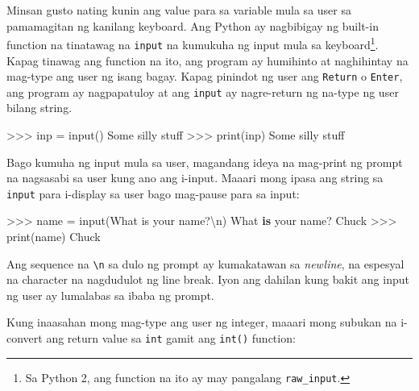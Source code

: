 \documentclass[10pt,]{book}
\newenvironment{Shaded}{}{}
\newcommand{\BuiltInTok}[1]{\textcolor[rgb]{0.00,0.50,0.00}{#1}}
\newcommand{\CharTok}[1]{\textcolor[rgb]{0.25,0.44,0.63}{#1}}
\newcommand{\KeywordTok}[1]{\textcolor[rgb]{0.00,0.44,0.13}{\textbf{#1}}}
\newcommand{\NormalTok}[1]{#1}
\newcommand{\OperatorTok}[1]{\textcolor[rgb]{0.40,0.40,0.40}{#1}}
\newcommand{\StringTok}[1]{\textcolor[rgb]{0.25,0.44,0.63}{#1}}
\begin{document}
Minsan gusto nating kunin ang value para sa variable mula sa user sa
pamamagitan ng kanilang keyboard. Ang Python ay nagbibigay ng built-in
function na tinatawag na \texttt{input} na kumukuha ng input mula sa
keyboard\footnote{Sa Python 2, ang function na ito ay may pangalang
  \texttt{raw\_input}.}. Kapag tinawag ang function na ito, ang program
ay humihinto at naghihintay na mag-type ang user ng isang bagay. Kapag
pinindot ng user ang \texttt{Return} o \texttt{Enter}, ang program ay
nagpapatuloy at ang \texttt{input} ay nagre-return ng na-type ng user
bilang string.


\begin{Shaded}
\begin{Highlighting}[]
\OperatorTok{\textgreater{}\textgreater{}\textgreater{}}\NormalTok{ inp }\OperatorTok{=} \BuiltInTok{input}\NormalTok{()}
\NormalTok{Some silly stuff}
\OperatorTok{\textgreater{}\textgreater{}\textgreater{}} \BuiltInTok{print}\NormalTok{(inp)}
\NormalTok{Some silly stuff}
\end{Highlighting}
\end{Shaded}

Bago kumuha ng input mula sa user, magandang ideya na mag-print ng
prompt na nagsasabi sa user kung ano ang i-input. Maaari mong ipasa ang
string sa \texttt{input} para i-display sa user bago mag-pause para sa
input:


\begin{Shaded}
\begin{Highlighting}[]
\OperatorTok{\textgreater{}\textgreater{}\textgreater{}}\NormalTok{ name }\OperatorTok{=} \BuiltInTok{input}\NormalTok{(}\StringTok{\textquotesingle{}What is your name?}\CharTok{\textbackslash{}n}\StringTok{\textquotesingle{}}\NormalTok{)}
\NormalTok{What }\KeywordTok{is}\NormalTok{ your name?}
\NormalTok{Chuck}
\OperatorTok{\textgreater{}\textgreater{}\textgreater{}} \BuiltInTok{print}\NormalTok{(name)}
\NormalTok{Chuck}
\end{Highlighting}
\end{Shaded}

Ang sequence na \texttt{\textbackslash{}n} sa dulo ng prompt ay
kumakatawan sa \emph{newline}, na espesyal na character na nagdudulot ng
line break. Iyon ang dahilan kung bakit ang input ng user ay lumalabas
sa ibaba ng prompt.


Kung inaasahan mong mag-type ang user ng integer, maaari mong subukan na
i-convert ang return value sa \texttt{int} gamit ang \texttt{int()}
function:
\end{document}
